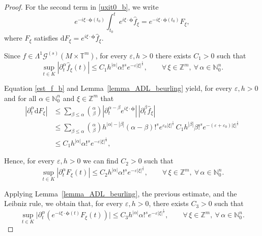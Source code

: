 \documentclass[11pt,reqno]{amsart}
\numberwithin{equation}{section}
\begin{document}
\begin{proof}
		For the second term in \eqref{uxit0_b}, we write
		\[
		e^{-i\xi\cdot\boldsymbol{\phi}(t_0)}\int_{t_0}^t e^{i\xi\cdot\boldsymbol{\phi}}\widehat{f}_\xi
		=
		e^{-i\xi\cdot\boldsymbol{\phi}(t_0)}F_\xi,
		\]
		where \(F_\xi\) satisfies \(\mathrm{d}F_\xi = e^{i\xi\cdot\boldsymbol{\phi}}\widehat{f}_\xi\).
		
		Since \(f\in\mathsf{\Lambda}^1\mathscr{G}^{(s)}(M\times\mathbb{T}^m)\), for every \(\varepsilon,h>0\) there exists \(C_1>0\) such that
		\begin{equation}\label{est_f_b} 
			\sup_{t\in K}|\partial_t^\alpha\widehat{f}_\xi(t)|
			\leq
			C_1h^{|\alpha|}\alpha!^s e^{-\varepsilon|\xi|^{\frac{1}{s}}},\qquad\forall\,\xi\in\mathbb{Z}^m,\ \forall\,\alpha\in\mathbb{N}_0^n.
		\end{equation}
		
		Equation \eqref{est_f_b} and Lemma~\ref{lemma_ADL_beurling} yield, for every \(\varepsilon,h>0\) and for all \(\alpha\in\mathbb{N}_0^n\) and \(\xi\in\mathbb{Z}^m\) that
		\begin{align*}
			|\partial_t^\alpha\mathrm{d}F_\xi|
			&\leq
			\sum_{\beta\leq\alpha}\binom{\alpha}{\beta}
			|\partial_t^{\alpha-\beta}e^{i\xi\cdot\boldsymbol{\phi}}|\,
			|\partial_t^{\beta}\widehat{f}_\xi|\\
			&\leq
			\sum_{\beta\leq\alpha}\binom{\alpha}{\beta}
			h^{|\alpha|-|\beta|}(\alpha-\beta)!^s e^{\varepsilon_0|\xi|^{\frac{1}{s}}}
			\, C_1h^{|\beta|}\beta!^s e^{-(\varepsilon+\varepsilon_0)|\xi|^{\frac{1}{s}}}\\
			&\leq
			C_1h^{|\alpha|}\alpha!^s e^{-\varepsilon|\xi|^{\frac{1}{s}}},
		\end{align*}
		
		Hence, for every \(\varepsilon,h>0\) we can find \(C_2>0\) such that
		\[
		\sup_{t\in K}|\partial_t^\alpha F_\xi(t)|
		\leq
		C_2h^{|\alpha|}\alpha!^s e^{-\varepsilon|\xi|^{\frac{1}{s}}},\qquad\forall\,\xi\in\mathbb{Z}^m,\ \forall\,\alpha\in\mathbb{N}_0^n.
		\]
		
		Applying Lemma~\ref{lemma_ADL_beurling}, the previous estimate, and the Leibniz rule, we obtain that, for every \(\varepsilon,h>0\), there exists \(C_3>0\) such that
		\begin{equation}\label{est_eF_b}
			\sup_{t\in K}\bigl|\partial_t^\alpha(e^{-i\xi\cdot\boldsymbol{\phi}(t)}F_\xi(t))\bigr|
			\leq
			C_3h^{|\alpha|}\alpha!^s e^{-\varepsilon|\xi|^{\frac{1}{s}}},\qquad\forall\,\xi\in\mathbb{Z}^m,\ \forall\,\alpha\in\mathbb{N}_0^n.
		\end{equation}
		

\end{proof}
\end{document}
